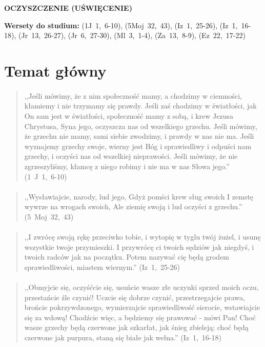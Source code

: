 \documentclass[10pt,a4paper,oneside]{article}
\begin{document}
\centerline{\textbf{\MakeUppercase{Oczyszczenie (uświęcenie)}}}
\begin{center}
\textbf{Wersety do studium:} 
\mbox{(1J 1, 6-10)}, \mbox{(5Moj 32, 43)}, \mbox{(Iz 1, 25-26)}, \mbox{(Iz 1, 16-18)}, \mbox{(Jr 13, 26-27)}, \mbox{(Jr 6, 27-30)}, \mbox{(Ml 3, 1-4)}, \mbox{(Za 13, 8-9)}, \mbox{(Ez 22, 17-22)}
\end{center}
\section{Temat główny}
\paragraph{}
\begin{quote}
,,Jeśli mówimy, że z nim społeczność mamy, a chodzimy w ciemności, kłamiemy i nie trzymamy się prawdy. Jeśli zaś chodzimy w światłości, jak On sam jest w światłości, społeczność mamy z sobą, i krew Jezusa Chrystusa, Syna jego, oczyszcza nas od wszelkiego grzechu. Jeśli mówimy, że grzechu nie mamy, sami siebie zwodzimy, i prawdy w nas nie ma. Jeśli wyznajemy grzechy swoje, wierny jest Bóg i sprawiedliwy i odpuści nam grzechy, i oczyści nas od wszelkiej nieprawości. Jeśli mówimy, że nie zgrzeszyliśmy, kłamcę z niego robimy i nie ma w nas Słowa jego.'' \mbox{(1 J 1, 6-10)}
\end{quote}
\paragraph{}
\begin{quote}
,,Wysławiajcie, narody, lud jego, Gdyż pomści krew sług swoich I zemstę wywrze na wrogach swoich, Ale ziemię swoją i lud oczyści z grzechu.'' \mbox{(5 Moj 32, 43)}
\end{quote}
\paragraph{}
\begin{quote}
,,I zwrócę swoją rękę przeciwko tobie, i wytopię w tyglu twój żużel, i usunę wszystkie twoje przymieszki. I przywrócę ci twoich sędziów jak niegdyś, i twoich radców jak na początku. Potem nazywać cię będą grodem sprawiedliwości, miastem wiernym.'' \mbox{(Iz 1, 25-26)}
\end{quote}
\paragraph{}
\begin{quote}
,,Obmyjcie się, oczyśćcie się, usuńcie wasze złe uczynki sprzed moich oczu, przestańcie źle czynić! Uczcie się dobrze czynić, przestrzegajcie prawa, brońcie pokrzywdzonego, wymierzajcie sprawiedliwość sierocie, wstawiajcie się za wdową! Chodźcie więc, a będziemy się prawować - mówi Pan! Choć wasze grzechy będą czerwone jak szkarłat, jak śnieg zbieleją; choć będą czerwone jak purpura, staną się białe jak wełna.'' \mbox{(Iz 1, 16-18)}
\end{quote}
\end{document}
